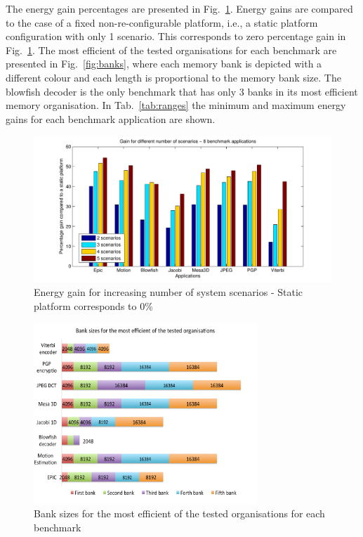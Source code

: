The energy gain percentages are presented in Fig.~\ref{fig:gainsC}. 
Energy gains are compared to the case of a fixed non-re-configurable platform, i.e., a static platform configuration with only 1 scenario. 
This corresponds to zero percentage gain in Fig.~\ref{fig:gainsC}. 
The most efficient of the tested organisations for each benchmark are presented in Fig.~\ref{fig:banks}, where each memory bank is depicted with a different colour and each length is proportional to the memory bank size. 
The blowfish decoder is the only benchmark that has only 3 banks in its most efficient memory organisation. 
In Tab.~\ref{tab:ranges} the minimum and maximum energy gains for each benchmark application are shown.

\begin{figure}
\centering
\includegraphics[width=\textwidth]{C/6appsGains.pdf}
\caption{Energy gain for increasing number of system scenarios - Static platform corresponds to 0\%}
\label{fig:gainsC}
\end{figure}

\begin{figure}
\centering
\includegraphics[width=0.75\textwidth]{C/banks2.pdf}
\caption{Bank sizes for the most efficient of the tested organisations for each benchmark}
\label{fig:banksC}
\end{figure}

